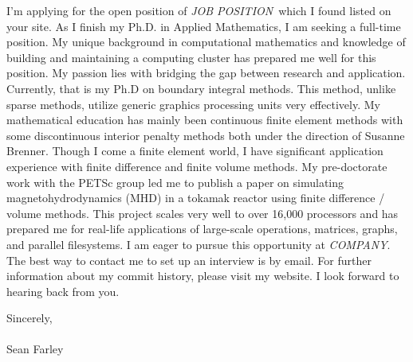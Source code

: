 \documentclass[]{fancy-cv}
\newcommand\company{\emph{COMPANY}}
\newcommand\position{\emph{JOB POSITION}}
\begin{document}
I'm applying for the open position of \position~which I found listed on your
site. As I finish my Ph.D. in Applied Mathematics, I am seeking a full-time
position. My unique background in computational mathematics and knowledge of
building and maintaining a computing cluster has prepared me well for this
position.
%
\newline\newline
%
My passion lies with bridging the gap between research and application.
Currently, that is my Ph.D on boundary integral methods. This method, unlike
sparse methods, utilize generic graphics processing units very effectively. My
mathematical education has mainly been continuous finite element methods with
some discontinuous interior penalty methods both under the direction of Susanne
Brenner. Though I come a finite element world, I have significant application
experience with finite difference and finite volume methods.
%
\newline\newline
%
My pre-doctorate work with the PETSc group led me to publish a paper on
simulating magnetohydrodynamics (MHD) in a tokamak reactor using finite
difference / volume methods. This project scales very well to over 16,000
processors and has prepared me for real-life applications of large-scale
operations, matrices, graphs, and parallel filesystems.
%
\newline\newline
%
I am eager to pursue this opportunity at \company. The best way to contact me
to set up an interview is by email. For further information about my commit
history, please visit my website. I look forward to hearing back from you.

\vspace{2em}
Sincerely,\\
\\
Sean Farley
\end{document}

